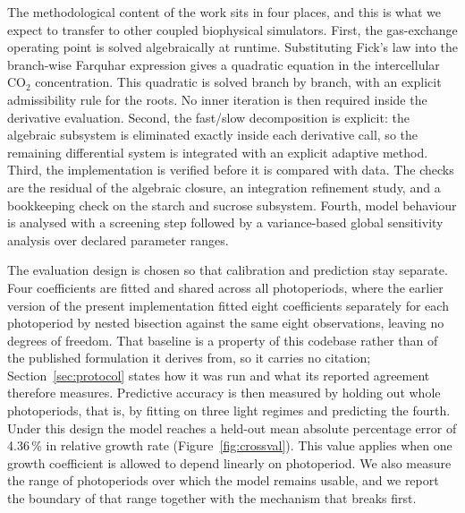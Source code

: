 The methodological content of the work sits in four places, and this is what we
expect to transfer to other coupled biophysical simulators. First, the
gas-exchange operating point is solved algebraically at runtime. Substituting
Fick's law into the branch-wise Farquhar expression gives a quadratic equation
in the intercellular CO$_2$ concentration. This quadratic is solved branch by
branch, with an explicit admissibility rule for the roots. No inner iteration
is then required inside the derivative evaluation. Second, the fast/slow decomposition
is explicit: the algebraic subsystem is eliminated exactly inside each
derivative call, so the remaining differential system is integrated with an
explicit adaptive method. Third, the implementation is verified before it is
compared with data. The checks are the residual of the algebraic closure, an
integration refinement study, and a bookkeeping check on the starch and sucrose
subsystem.
Fourth, model behaviour is analysed with a screening step followed by a
variance-based global sensitivity analysis over declared parameter ranges.

The evaluation design is chosen so that calibration and prediction stay
separate. Four coefficients are fitted and shared across all photoperiods,
where the earlier version of the present implementation fitted eight
coefficients separately for each photoperiod by nested bisection against the
same eight observations, leaving no degrees of freedom. That baseline is a
property of this codebase rather than of the published formulation it derives
from, so it carries no citation; Section~\ref{sec:protocol} states how it was
run and what its reported agreement therefore measures. Predictive accuracy is then measured by
holding out whole photoperiods, that is, by fitting on three light regimes and
predicting the fourth. Under this design the model reaches a held-out mean
absolute percentage error of 4.36\,\% in relative growth rate
(Figure~\ref{fig:crossval}). This value applies when one growth coefficient is
allowed to depend linearly on photoperiod. We also measure the
range of photoperiods over which the model remains usable, and we report the
boundary of that range together with the mechanism that breaks first.

